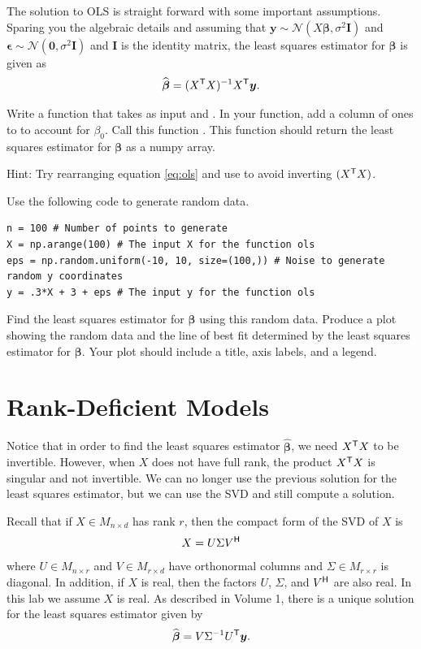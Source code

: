 The solution to OLS is straight forward with some important assumptions. Sparing you the algebraic details and assuming that
$\boldsymbol y \sim \mathcal{N}(X\boldsymbol\beta, \sigma^2 \boldsymbol I)$ and $\boldsymbol\epsilon \sim \mathcal{N}(\boldsymbol 0, \sigma^2 \boldsymbol I)$ and $\boldsymbol I$ is the identity matrix,
the least squares estimator for $\boldsymbol\beta$ is given as
\begin{equation}
\widehat{\boldsymbol\beta} = (X^{\mathsf T} X)^{-1} X^{\mathsf T}  \boldsymbol y .
\label{eq:ols}
\end{equation}

\begin{problem}
Write a function that takes as input  and .
In your function, add a column of ones to  to account for $\beta_0$.
Call this function .
This function should return the least squares estimator for $\boldsymbol\beta$ as a numpy array.

Hint: Try rearranging equation \eqref{eq:ols} and use  to avoid inverting $(X^{\mathsf T}  X)$.
\end{problem}

\begin{problem}
Use the following code to generate random data.
\begin{lstlisting}
n = 100 # Number of points to generate
X = np.arange(100) # The input X for the function ols
eps = np.random.uniform(-10, 10, size=(100,)) # Noise to generate random y coordinates
y = .3*X + 3 + eps # The input y for the function ols
\end{lstlisting}
Find the least squares estimator for $\boldsymbol\beta$ using this random data.
Produce a plot showing the random data and the line of best fit determined by the least squares estimator for $\boldsymbol\beta$.
Your plot should include a title, axis labels, and a legend.
\end{problem}

\section*{Rank-Deficient Models}
Notice that in order to find the least squares estimator $\widehat{\boldsymbol\beta}$, we need $X^{\mathsf T} X$ to be invertible.
However, when $X$ does not have full rank, the product $X^{\mathsf T} X$ is singular and not invertible.
We can no longer use the previous solution for the least squares estimator, but we can use the SVD and still compute a solution.

Recall that if $X \in M_{n\times d}$ has rank $r$, then the compact form of the SVD of $X$ is \[ X = U\Sigma V^{\mathsf H}  \]
where $U \in M_{n\times r}$ and $V \in M_{r\times d}$ have orthonormal columns and $\Sigma \in M_{r\times r}$ is diagonal.
In addition, if $X$ is real, then the factors $U$, $\Sigma$, and $V^{\mathsf H} $ are also real. In this lab we assume $X$ is real.
As described in Volume 1, there is a unique solution for the least squares estimator given by
\begin{equation}
\widehat{\boldsymbol\beta} = V \Sigma^{-1}U^{\mathsf T} \boldsymbol y.
\end{equation}


